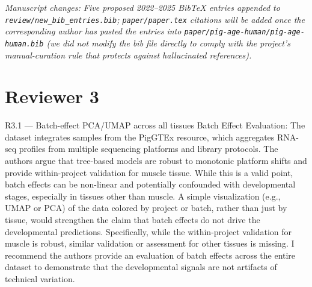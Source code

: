 \documentclass[11pt,a4paper]{article}
\newcommand{\changeloc}[1]{\par\noindent\textit{\small Manuscript changes: #1}\par}
\begin{document}
\changeloc{Five proposed 2022--2025 BibTeX entries appended to
\texttt{review/new\_bib\_entries.bib}; \texttt{paper/paper.tex} citations
will be added once the corresponding author has pasted the entries into
\texttt{paper/pig-age-human/pig-age-human.bib} (we did not modify the
bib file directly to comply with the project's manual-curation rule
that protects against hallucinated references).}

\section*{Reviewer 3}

\begin{reviewerbox}{R3.1 — Batch-effect PCA/UMAP across all tissues}
Batch Effect Evaluation: The dataset integrates samples from the PigGTEx
resource, which aggregates RNA-seq profiles from multiple sequencing
platforms and library protocols. The authors argue that tree-based models are
robust to monotonic platform shifts and provide within-project validation for
muscle tissue. While this is a valid point, batch effects can be non-linear
and potentially confounded with developmental stages, especially in tissues
other than muscle. A simple visualization (e.g., UMAP or PCA) of the data
colored by project or batch, rather than just by tissue, would strengthen the
claim that batch effects do not drive the developmental predictions.
Specifically, while the within-project validation for muscle is robust,
similar validation or assessment for other tissues is missing.
I recommend the authors provide an evaluation of batch effects across the
entire dataset to demonstrate that the developmental signals are not artifacts
of technical variation.
\end{reviewerbox}
\end{document}
